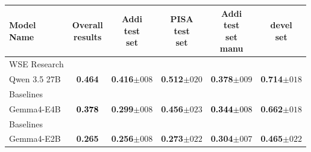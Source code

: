\begin{tabularx}{\textwidth}{X | c c c c c}
\hline
\makecell[b]{\textbf{Model} \\ \textbf{Name}} & \makecell[b]{\textbf{Overall} \\ \textbf{results}} & \makecell[b]{\textbf{Addi} \\ \textbf{test} \\ \textbf{set}} & \makecell[b]{\textbf{PISA} \\ \textbf{test} \\ \textbf{set}} & \makecell[b]{\textbf{Addi} \\ \textbf{test} \\ \textbf{set} \\ \textbf{manu}} & \makecell[b]{\textbf{devel} \\ \textbf{set}} \\
\hline
WSE Research\\\subcatarrow{}Qwen 3.5 27B & \textbf{\textcolor{BrickRed}{0.464}} & \textbf{\textcolor{BrickRed}{0.416$\pm{}008$}} & \textbf{\textcolor{BrickRed}{0.512$\pm{}020$}} & \textbf{\textcolor{BrickRed}{0.378$\pm{}009$}} & \textbf{\textcolor{BrickRed}{0.714$\pm{}018$}} \\
Baselines\\\subcatarrow{}Gemma4-E4B & \textbf{\textcolor{Black}{0.378}} & \textbf{\textcolor{White!50!NavyBlue}{0.299$\pm{}008$}} & \textbf{\textcolor{White!50!BrickRed}{0.456$\pm{}023$}} & \textbf{\textcolor{Black}{0.344$\pm{}008$}} & \textbf{\textcolor{White!50!BrickRed}{0.662$\pm{}018$}} \\
Baselines\\\subcatarrow{}Gemma4-E2B & \textbf{\textcolor{NavyBlue}{0.265}} & \textbf{\textcolor{NavyBlue}{0.256$\pm{}008$}} & \textbf{\textcolor{NavyBlue}{0.273$\pm{}022$}} & \textbf{\textcolor{NavyBlue}{0.304$\pm{}007$}} & \textbf{\textcolor{NavyBlue}{0.465$\pm{}022$}} \\
\hline
\end{tabularx}
